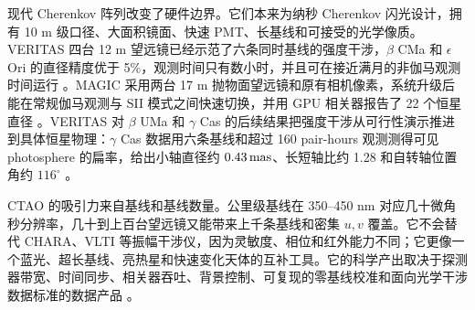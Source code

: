 现代 Cherenkov 阵列改变了硬件边界。它们本来为纳秒 Cherenkov 闪光设计，拥有 10 m 级口径、大面积镜面、快速 PMT、长基线和可接受的光学像质。VERITAS 四台 12 m 望远镜已经示范了六条同时基线的强度干涉，\(\beta\) CMa 和 \(\epsilon\) Ori 的直径精度优于 5\%，观测时间只有数小时，并且可在接近满月的非伽马观测时间运行 \citep{2020NatAs...4.1164A}。MAGIC 采用两台 17 m 抛物面望远镜和原有相机像素，系统升级后能在常规伽马观测与 SII 模式之间快速切换，并用 GPU 相关器报告了 22 个恒星直径 \citep{2024MNRAS.529.4387A}。VERITAS 对 \(\beta\) UMa 和 \(\gamma\) Cas 的后续结果把强度干涉从可行性演示推进到具体恒星物理：\(\gamma\) Cas 数据用六条基线和超过 160 pair-hours 观测测得可见 photosphere 的扁率，给出小轴直径约 \(0.43\,{\rm mas}\)、长短轴比约 1.28 和自转轴位置角约 \(116^\circ\) \citep{2024ApJ...966...28A,2025ApJ...995..191A}。

CTAO 的吸引力来自基线和基线数量。公里级基线在 350--450 nm 对应几十微角秒分辨率，几十到上百台望远镜又能带来上千条基线和密集 \(u,v\) 覆盖。它不会替代 CHARA、VLTI 等振幅干涉仪，因为灵敏度、相位和红外能力不同；它更像一个蓝光、超长基线、亮热星和快速变化天体的互补工具。它的科学产出取决于探测器带宽、时间同步、相关器吞吐、背景控制、可复现的零基线校准和面向光学干涉数据标准的数据产品 \citep{2009A&A...507.1719F,2010SPIE.7734E..1CN,2010SPIE.7734E..1TJ,2013APh....43..331D,2014SPIE.9146E..0ZD,2022icrc.confE.803K,2024SPIE13095E..0IT}。

